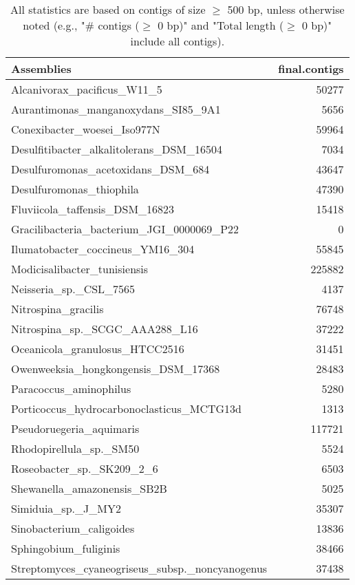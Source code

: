 \documentclass[12pt,a4paper]{article}
\begin{document}
\begin{table}[ht]
\begin{center}
\caption{All statistics are based on contigs of size $\geq$ 500 bp, unless otherwise noted (e.g., "\# contigs ($\geq$ 0 bp)" and "Total length ($\geq$ 0 bp)" include all contigs).}
\begin{tabular}{|l*{1}{|r}|}
\hline
Assemblies & final.contigs \\ \hline
Alcanivorax\_pacificus\_W11\_5 & 50277 \\ \hline
Aurantimonas\_manganoxydans\_SI85\_9A1 & 5656 \\ \hline
Conexibacter\_woesei\_Iso977N & 59964 \\ \hline
Desulfitibacter\_alkalitolerans\_DSM\_16504 & 7034 \\ \hline
Desulfuromonas\_acetoxidans\_DSM\_684 & 43647 \\ \hline
Desulfuromonas\_thiophila & 47390 \\ \hline
Fluviicola\_taffensis\_DSM\_16823 & 15418 \\ \hline
Gracilibacteria\_bacterium\_JGI\_0000069\_P22 & 0 \\ \hline
Ilumatobacter\_coccineus\_YM16\_304 & 55845 \\ \hline
Modicisalibacter\_tunisiensis & 225882 \\ \hline
Neisseria\_sp.\_CSL\_7565 & 4137 \\ \hline
Nitrospina\_gracilis & 76748 \\ \hline
Nitrospina\_sp.\_SCGC\_AAA288\_L16 & 37222 \\ \hline
Oceanicola\_granulosus\_HTCC2516 & 31451 \\ \hline
Owenweeksia\_hongkongensis\_DSM\_17368 & 28483 \\ \hline
Paracoccus\_aminophilus & 5280 \\ \hline
Porticoccus\_hydrocarbonoclasticus\_MCTG13d & 1313 \\ \hline
Pseudoruegeria\_aquimaris & 117721 \\ \hline
Rhodopirellula\_sp.\_SM50 & 5524 \\ \hline
Roseobacter\_sp.\_SK209\_2\_6 & 6503 \\ \hline
Shewanella\_amazonensis\_SB2B & 5025 \\ \hline
Simiduia\_sp.\_J\_MY2 & 35307 \\ \hline
Sinobacterium\_caligoides & 13836 \\ \hline
Sphingobium\_fuliginis & 38466 \\ \hline
Streptomyces\_cyaneogriseus\_subsp.\_noncyanogenus & 37438 \\ \hline

\end{tabular}
\end{center}
\end{table}
\end{document}
